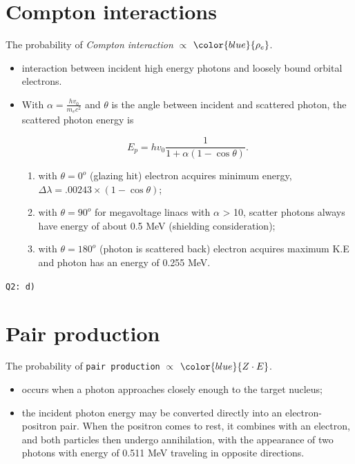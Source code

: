 \documentclass[]{book}
\providecommand{\tightlist}{%
  \setlength{\itemsep}{0pt}\setlength{\parskip}{0pt}}
\theoremstyle{definition}
\theoremstyle{definition}
\theoremstyle{definition}
\theoremstyle{remark}
\begin{document}
\section{Compton interactions}\label{compton}

The probability of \emph{Compton interaction} \(\propto\)
\(\color{blue} {\rho_e}\).

\begin{itemize}
\tightlist
\item
  interaction between incident high energy photons and loosely bound
  orbital electrons.
\item
  With \(\alpha = \frac{hv_0}{m_ec^2}\) and \(\theta\) is the angle
  between incident and scattered photon, the scattered photon energy is

  \begin{equation*}
    E_p = hv_0\frac{1}{1+\alpha(1-\cos\theta)}.
  \end{equation*}

  \begin{enumerate}
  \def\labelenumi{\alph{enumi}.}
  \tightlist
  \item
    with \(\theta = 0^o\) (glazing hit) electron acquires minimum
    energy, \(\Delta\lambda = .00243\times(1-\cos\theta)\);
  \item
    with \(\theta = 90^o\) for megavoltage linacs with \(\alpha\)
    \textgreater{} 10, scatter photons always have energy of about 0.5
    MeV (shielding consideration);
  \item
    with \(\theta = 180^o\) (photon is scattered back) electron acquires
    maximum K.E and photon has an energy of 0.255 MeV.
  \end{enumerate}
\end{itemize}

\texttt{Q2:\ d)}

\section{Pair production}\label{pair}

The probability of \texttt{pair\ production} \(\propto\)
\(\color{blue} {Z\cdot E}\).

\begin{itemize}
\tightlist
\item
  occurs when a photon approaches closely enough to the target nucleus;
\item
  the incident photon energy may be converted directly into an
  electron-positron pair. When the positron comes to rest, it combines
  with an electron, and both particles then undergo annihilation, with
  the appearance of two photons with energy of 0.511 MeV traveling in
  opposite directions.
\end{itemize}
\end{document}
